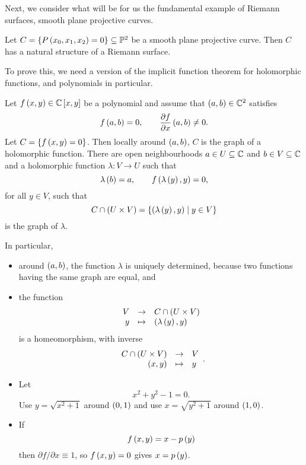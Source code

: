 Next, we consider what will be for us the fundamental example of Riemann surfaces, smooth plane projective curves.

\begin{lemma}
\label{lem:15.5}
Let $ C = \left\{ P\left( x_0, x_1, x_2 \right) = 0 \right\} \subseteq \mathbb{P}^2 $ be a smooth plane projective curve. Then $ C $ has a natural structure of a Riemann surface.
\end{lemma}

To prove this, we need a version of the implicit function theorem for holomorphic functions, and polynomials in particular.

\begin{theorem}
Let $ f\left( x, y \right) \in \mathbb{C}\left[ x, y \right] $ be a polynomial and assume that $ \left( a, b \right) \in \mathbb{C}^2 $ satisfies
$$ f\left( a, b \right) = 0, \qquad \dfrac{\partial f}{\partial x}\left( a, b \right) \ne 0. $$
Let $ C = \left\{ f\left( x, y \right) = 0 \right\} $. Then locally around $ \left( a, b \right) $, $ C $ is the graph of a holomorphic function. There are open neighbourhoods $ a \in U \subseteq \mathbb{C} $ and $ b \in V \subseteq \mathbb{C} $ and a holomorphic function $ \lambda : V \to U $ such that
$$ \lambda\left( b \right) = a, \qquad f\left( \lambda\left( y \right), y \right) = 0, $$
for all $ y \in V $, such that
$$ C \cap \left( U \times V \right) = \left\{ \left( \lambda\left( y \right), y \right) \mid y \in V \right\} $$
is the graph of $ \lambda $.
\end{theorem}

\begin{note*}
In particular,
\begin{itemize}
\item around $ \left( a, b \right) $, the function $ \lambda $ is uniquely determined, because two functions having the same graph are equal, and
\item the function
$$ \function{V}{C \cap \rb{U \times V}}{y}{\rb{\lambda\rb{y}, y}} $$
is a homeomorphism, with inverse
$$ \function{C \cap \rb{U \times V}}{V}{\rb{x, y}}{y}. $$
\end{itemize}
\end{note*}

\begin{example*}
\hfill
\begin{itemize}
\item Let
$$ x^2 + y^2 - 1 = 0. $$
Use $ y = \sqrt{x^2 + 1} $ around $ \left( 0, 1 \right) $ and use $ x = \sqrt{y^2 + 1} $ around $ \left( 1, 0 \right) $.
\item If
$$ f\left( x, y \right) = x - p\left( y \right) $$
then $ \partial f / \partial x \equiv 1 $, so $ f\left( x, y \right) = 0 $ gives $ x = p\left( y \right) $.
\end{itemize}
\end{example*}

